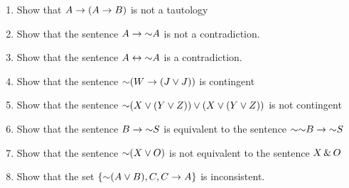 {\begin{enumerate}[label=(\arabic*)]
\item Show that $A \rightarrow (A \rightarrow B)$ is not a tautology
\item Show that the sentence $A \rightarrow \mathord{\sim}{A}$ is not a contradiction.




\item Show that the sentence $A \leftrightarrow \mathord{\sim} A$ is a contradiction. 
\item Show that the sentence $ \mathord{\sim} (W \rightarrow (J \vee J)) $ is contingent




\item Show that the sentence $ \mathord{\sim}(X \vee (Y \vee Z)) \vee (X \vee (Y \vee Z))$ is not contingent
 \item Show that the sentence $B \rightarrow \mathord{\sim} S$ is equivalent to the sentence $\mathord{\sim} \mathord{\sim} B \rightarrow \mathord{\sim} S$
 
 
 

 
\item Show that the sentence $ \mathord{\sim} (X \vee O) $ is not equivalent to the sentence $X \,\&\, O$
\item Show that the set $\{\mathord{\sim}(A \vee B), C, C \rightarrow A\}$ is inconsistent.


\end{enumerate}}

